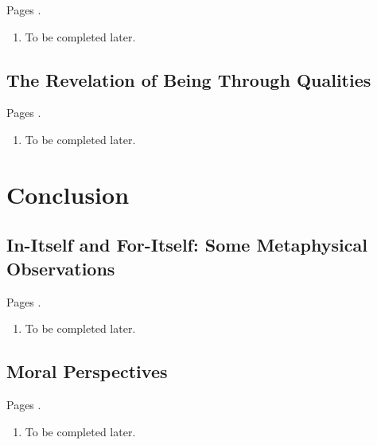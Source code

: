 Pages \autocite[746 -- 777]{sartre}.

\begin{enumerate}
  \item To be completed later.
\end{enumerate}

\subsection{The Revelation of Being Through Qualities}

Pages \autocite[777 -- 798]{sartre}.

\begin{enumerate}
  \item To be completed later.
\end{enumerate}

\section{Conclusion}

\subsection{In-Itself and For-Itself: Some Metaphysical Observations}

Pages \autocite[798 -- 809]{sartre}.

\begin{enumerate}
  \item To be completed later.
\end{enumerate}

\subsection{Moral Perspectives}

Pages \autocite[809 -- 811]{sartre}.

\begin{enumerate}
  \item To be completed later.
\end{enumerate}
